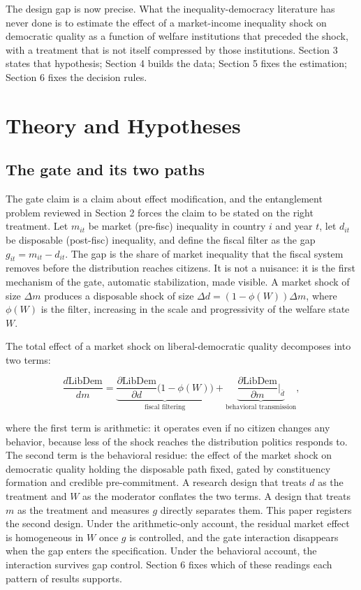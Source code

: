 \documentclass[11pt,letterpaper]{article}
\begin{document}
The design gap is now precise. What the inequality-democracy literature has never done is to estimate the effect of a market-income inequality shock on democratic quality as a function of welfare institutions that preceded the shock, with a treatment that is not itself compressed by those institutions. Section 3 states that hypothesis; Section 4 builds the data; Section 5 fixes the estimation; Section 6 fixes the decision rules.

\section{Theory and Hypotheses}

\subsection{The gate and its two paths}

The gate claim is a claim about effect modification, and the entanglement problem reviewed in Section 2 forces the claim to be stated on the right treatment. Let $m_{it}$ be market (pre-fisc) inequality in country $i$ and year $t$, let $d_{it}$ be disposable (post-fisc) inequality, and define the fiscal filter as the gap $g_{it} = m_{it} - d_{it}$. The gap is the share of market inequality that the fiscal system removes before the distribution reaches citizens. It is not a nuisance: it is the first mechanism of the gate, automatic stabilization, made visible. A market shock of size $\Delta m$ produces a disposable shock of size $\Delta d = (1 - \phi(W)) \Delta m$, where $\phi(W)$ is the filter, increasing in the scale and progressivity of the welfare state $W$.

The total effect of a market shock on liberal-democratic quality decomposes into two terms:

\[
\frac{d \text{LibDem}}{d m} = \underbrace{\frac{\partial \text{LibDem}}{\partial d} \big(1 - \phi(W)\big)}_{\text{fiscal filtering}} + \underbrace{\frac{\partial \text{LibDem}}{\partial m}\Big|_{\bar d}}_{\text{behavioral transmission}},
\]

where the first term is arithmetic: it operates even if no citizen changes any behavior, because less of the shock reaches the distribution politics responds to. The second term is the behavioral residue: the effect of the market shock on democratic quality holding the disposable path fixed, gated by constituency formation and credible pre-commitment. A research design that treats $d$ as the treatment and $W$ as the moderator conflates the two terms. A design that treats $m$ as the treatment and measures $g$ directly separates them. This paper registers the second design. Under the arithmetic-only account, the residual market effect is homogeneous in $W$ once $g$ is controlled, and the gate interaction disappears when the gap enters the specification. Under the behavioral account, the interaction survives gap control. Section 6 fixes which of these readings each pattern of results supports.
\end{document}
